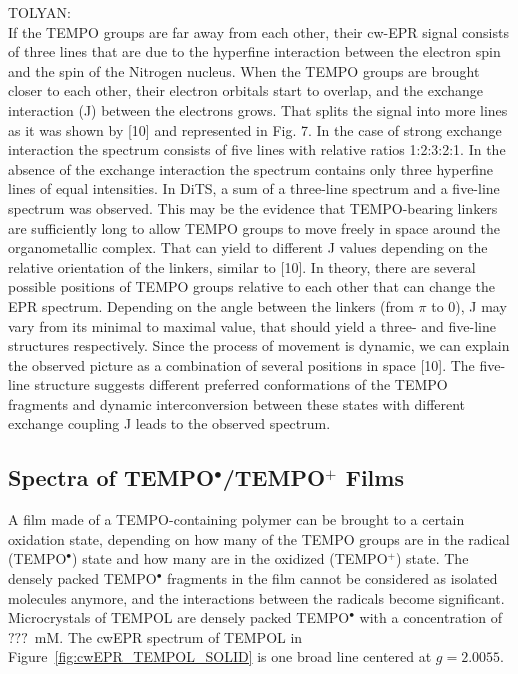 \par
TOLYAN:\\
If the TEMPO groups are far away from each other, their cw-EPR signal consists of three
lines that are due to the hyperfine interaction between the electron spin and the spin of the Nitrogen
nucleus. When the TEMPO groups are brought closer to each other, their electron orbitals start to
overlap, and the exchange interaction (J) between the electrons grows. That splits the signal into
more lines as it was shown by [10] and represented in Fig. 7. In the case of strong exchange
interaction the spectrum consists of five lines with relative ratios 1:2:3:2:1. In the absence of the
exchange interaction the spectrum contains only three hyperfine lines of equal intensities.
In DiTS, a sum of a three-line spectrum and a five-line spectrum was observed. This may
be the evidence that TEMPO-bearing linkers are sufficiently long to allow TEMPO groups to move
freely in space around the organometallic complex. That can yield to different J values depending
on the relative orientation of the linkers, similar to [10]. In theory, there are several possible
positions of TEMPO groups relative to each other that can change the EPR spectrum. Depending
on the angle between the linkers (from $\pi$ to 0), J may vary from its minimal to maximal value,
that should yield a three- and five-line structures respectively. Since the process of movement is
dynamic, we can explain the observed picture as a combination of several positions in space [10].
The five-line structure suggests different preferred conformations of the TEMPO fragments and
dynamic interconversion between these states with different exchange coupling J leads to the
observed spectrum.

\subsection{Spectra of TEMPO$^{\bullet}$/TEMPO$^{+}$ Films}
A film made of a TEMPO-containing polymer can be brought to a certain oxidation state, depending on how many of the TEMPO groups are in the radical (TEMPO$^{\bullet}$) state and how many are in the oxidized (TEMPO$^{+}$) state. The densely packed TEMPO$^{\bullet}$ fragments in the film cannot be considered as isolated molecules anymore, and the interactions between the radicals become significant. Microcrystals of TEMPOL are densely packed TEMPO$^{\bullet}$ with a concentration of $???$~mM. The cwEPR spectrum of TEMPOL in Figure~\ref{fig:cwEPR_TEMPOL_SOLID} is one broad line centered at $g=2.0055$.

